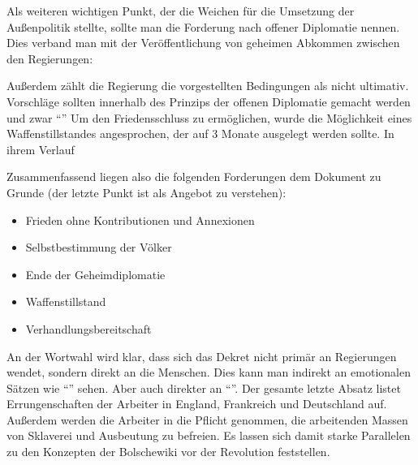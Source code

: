 \documentclass{../../sem_paper}
\begin{document}
Als weiteren wichtigen Punkt, der die Weichen für die Umsetzung der Außenpolitik stellte, sollte man die Forderung nach offener Diplomatie nennen. Dies verband man mit der Veröffentlichung von geheimen Abkommen zwischen den Regierungen:
\begin{quotation}

\autocite[15]{dekret}
\end{quotation}


Außerdem zählt die Regierung die vorgestellten Bedingungen als nicht ultimativ. Vorschläge sollten innerhalb des Prinzips der offenen Diplomatie gemacht werden und zwar "`"'\autocite[15]{dekret}
Um den Friedensschluss zu ermöglichen, wurde die Möglichkeit eines Waffenstillstandes angesprochen, der auf 3 Monate ausgelegt werden sollte. In ihrem Verlauf
\begin{quotation}
\autocite[15]{dekret}
\end{quotation}

Zusammenfassend liegen also die folgenden Forderungen dem Dokument zu Grunde (der letzte Punkt ist als Angebot zu verstehen):
\begin{itemize}
  \item Frieden ohne Kontributionen und Annexionen
  \item Selbstbestimmung der Völker
  \item Ende der Geheimdiplomatie
  \item Waffenstillstand
  \item Verhandlungsbereitschaft
\end{itemize}

An der Wortwahl wird klar, dass sich das Dekret nicht primär an Regierungen wendet, sondern direkt an die Menschen. Dies kann man indirekt an emotionalen Sätzen wie "`"' sehen. Aber auch direkter an "`"'\autocite[16]{dekret}. Der gesamte letzte Absatz listet Errungenschaften der Arbeiter in England, Frankreich und Deutschland auf. Außerdem werden die Arbeiter in die Pflicht genommen, die arbeitenden Massen von Sklaverei und Ausbeutung zu befreien.
Es lassen sich damit starke Parallelen zu den Konzepten der Bolschewiki vor der Revolution feststellen.
\end{document}
